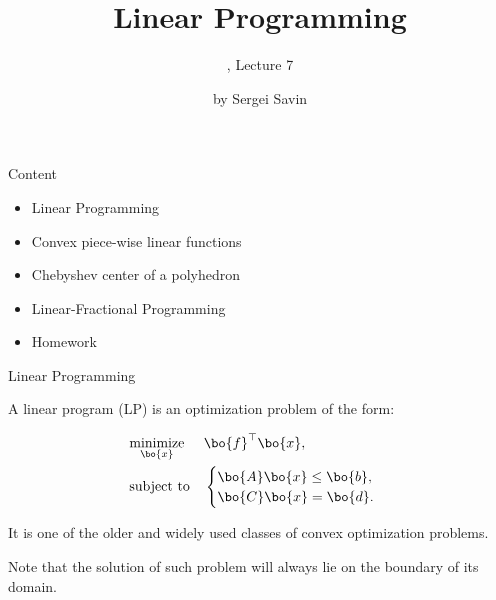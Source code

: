 \documentclass{beamer}
\title{Linear Programming}
\subtitle{\mycoursetitle, Lecture 7}
\author{by Sergei Savin}
\date{\mydate}
\begin{document}
\maketitle


\begin{frame}{Content}

\begin{itemize}
\item Linear Programming
\item Convex piece-wise linear functions
\item Chebyshev center of a polyhedron
\item Linear-Fractional Programming
\item Homework
\end{itemize}

\end{frame}



\begin{frame}{Linear Programming}
\begin{flushleft}

A linear program (LP) is an optimization problem of the form:

\begin{equation} \label{LP}
	\begin{aligned}
		& \underset{\bo{x}}{\text{minimize}}
		& & \bo{f}^\top \bo{x} , \\
		& \text{subject to}
		& & \begin{cases} 
			\bo{A}\bo{x} \leq \bo{b}, \\
			\bo{C}\bo{x} = \bo{d}.
		\end{cases}
	\end{aligned}
\end{equation}

It is one of the older and widely used classes of convex optimization problems. 

\bigskip

Note that the solution of such problem will always lie on the boundary of its domain.
 
\end{flushleft}
\end{frame}
\end{document}

